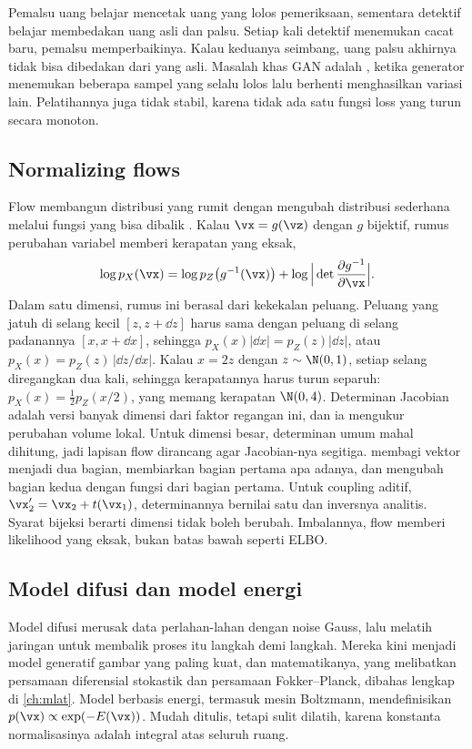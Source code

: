 Pemalsu uang belajar mencetak uang yang lolos pemeriksaan, sementara detektif belajar membedakan
uang asli dan palsu. Setiap kali detektif menemukan cacat baru, pemalsu memperbaikinya. Kalau
keduanya seimbang, uang palsu akhirnya tidak bisa dibedakan dari yang asli. Masalah khas GAN
adalah , ketika generator menemukan beberapa sampel yang selalu lolos lalu
berhenti menghasilkan variasi lain. Pelatihannya juga tidak stabil, karena tidak ada satu fungsi
loss yang turun secara monoton.

\subsection{Normalizing flows}

Flow membangun distribusi yang rumit dengan mengubah distribusi sederhana melalui fungsi yang bisa
dibalik \citep{rezende2015}. Kalau $\vx=g(\vz)$ dengan $g$ bijektif, rumus perubahan variabel
memberi kerapatan yang eksak,
\begin{equation}
\log p_X(\vx)=\log p_Z\big(g^{-1}(\vx)\big)+\log\Big|\det\frac{\partial g^{-1}}{\partial\vx}\Big|.
\end{equation}
Dalam satu dimensi, rumus ini berasal dari kekekalan peluang. Peluang yang jatuh di selang kecil
$[z,z+\dd z]$ harus sama dengan peluang di selang padanannya $[x,x+\dd x]$, sehingga
$p_X(x)|\dd x|=p_Z(z)|\dd z|$, atau $p_X(x)=p_Z(z)\,|\dd z/\dd x|$. Kalau $x=2z$ dengan $z\sim\N(0,1)$, setiap
selang diregangkan dua kali, sehingga kerapatannya harus turun separuh: $p_X(x)=\tfrac12p_Z(x/2)$, yang
memang kerapatan $\N(0,4)$. Determinan Jacobian adalah versi banyak dimensi dari faktor regangan ini,
dan ia mengukur perubahan volume lokal. Untuk dimensi besar, determinan umum mahal
dihitung, jadi lapisan flow dirancang agar Jacobian-nya segitiga.  membagi
vektor menjadi dua bagian, membiarkan bagian pertama apa adanya, dan mengubah bagian kedua dengan
fungsi dari bagian pertama. Untuk coupling aditif, $\vx_2'=\vx_2+t(\vx_1)$, determinannya bernilai
satu dan inversnya analitis. Syarat bijeksi berarti dimensi tidak boleh berubah. Imbalannya,
flow memberi likelihood yang eksak, bukan batas bawah seperti ELBO.

\subsection{Model difusi dan model energi}

Model difusi \citep{sohldickstein2015,ho2020} merusak data perlahan-lahan dengan noise Gauss, lalu
melatih jaringan untuk membalik proses itu langkah demi langkah. Mereka kini menjadi model
generatif gambar yang paling kuat, dan matematikanya, yang melibatkan persamaan diferensial
stokastik dan persamaan Fokker--Planck, dibahas lengkap di \cref{ch:mlat}. Model berbasis energi,
termasuk mesin Boltzmann, mendefinisikan $p(\vx)\propto\exp(-E(\vx))$. Mudah ditulis, tetapi sulit
dilatih, karena konstanta normalisasinya adalah integral atas seluruh ruang.


